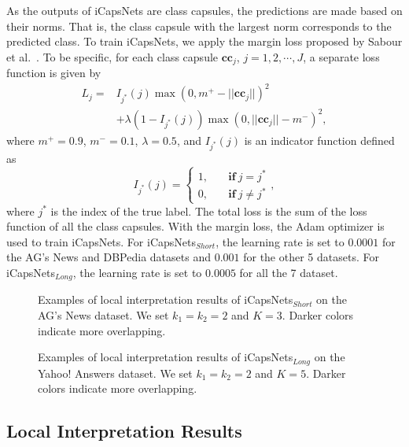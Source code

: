 \documentclass[10pt,journal,compsoc]{IEEEtran}
\begin{document}
As the outputs of iCapsNets are class capsules, the predictions are made based on their norms. That is, the class capsule with the largest norm corresponds to the predicted class. To train iCapsNets, we apply the margin loss proposed by Sabour et al.~\cite{sabour2017dynamic}. To be specific, for each class capsule $\mathbf{cc}_j$, $j=1,2,\cdots,J$, a separate loss function is given by
\begin{equation}
\begin{aligned}
L_j = & I_{j^*}(j)\max(0, m^+-||\mathbf{cc}_j||)^2 \\
 &+ \lambda(1-I_{j^*}(j))\max(0, ||\mathbf{cc}_j||-m^-)^2,
\end{aligned}
\end{equation}
where $m^+=0.9$, $m^-=0.1$, $\lambda=0.5$, and $I_{j^*}(j)$ is an indicator function defined as
\begin{equation}
I_{j^*}(j)=
\begin{cases}
1,\quad & \textbf{if}\ j = j^* \\
0,\quad & \textbf{if}\ j \neq j^*
\end{cases},
\end{equation}
where $j^*$ is the index of the true label. The total loss is the sum of the loss function of all the class capsules. With the margin loss, the Adam optimizer is used to train iCapsNets. For iCapsNets$_{Short}$, the learning rate is set to $0.0001$ for the AG's News and DBPedia datasets and $0.001$ for the other 5 datasets. For iCapsNets$_{Long}$, the learning rate is set to $0.0005$ for all the 7 dataset.



\begin{figure}[t]
	\centering
	\caption{Examples of local interpretation results of iCapsNets$_{Short}$ on the AG's News dataset. We set $k_1=k_2=2$ and $K=3$. Darker colors indicate more overlapping.}
	\label{fig:interpretag}
\end{figure}

\begin{figure}[t]
	\centering
	\caption{Examples of local interpretation results of iCapsNets$_{Long}$ on the Yahoo! Answers dataset. We set $k_1=k_2=2$ and $K=5$. Darker colors indicate more overlapping.}
	\label{fig:interpretyahoo}
\end{figure}

\subsection{Local Interpretation Results}\label{sec:local_interpret_results}
\end{document}
